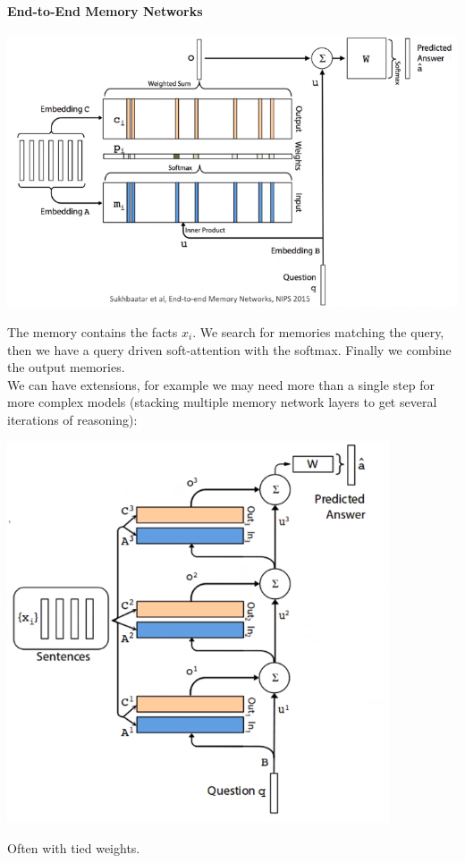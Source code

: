 \documentclass[10pt]{report}
\begin{document}
\paragraph{End-to-End Memory Networks}
\begin{center}
	\includegraphics[scale=0.75]{128.png}
\end{center}
The memory contains the facts $x_i$. We search for memories matching the query, then we have a query driven soft-attention with the softmax. Finally we combine the output memories.\\
We can have extensions, for example we may need more than a single step for more complex models (stacking multiple memory network layers to get several iterations of reasoning):
\begin{center}
	\includegraphics[scale=0.5]{129.png}
\end{center}
Often with tied weights.
\end{document}
